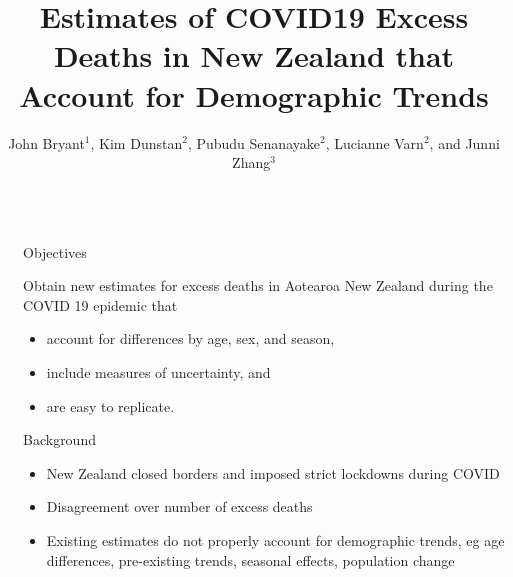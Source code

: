 \documentclass[final]{beamer}
\title{Estimates of COVID19 Excess Deaths in New Zealand that Account for Demographic Trends}
\author{John Bryant$^1$, Kim Dunstan$^2$, Pubudu Senanayake$^2$, Lucianne Varn$^2$, and Junni Zhang$^3$}
\institute{$^{1}$Bayesian Demograpy Limited, $^{2}$Statistics New Zealand, $^{3}$Peking University}
\newlength{\sepwid}
\newlength{\onecolwid}
\begin{document}

\setlength{\belowcaptionskip}{2ex} %
\setlength\belowdisplayshortskip{2ex} %

\begin{frame}[t] %

\begin{columns}[t] %

\begin{column}{\sepwid}\end{column} %

\begin{column}{\onecolwid} %



\begin{alertblock}{Objectives}

Obtain new estimates for excess deaths in Aotearoa New Zealand during the COVID 19 epidemic that
\begin{itemize}
\item account for differences by age, sex, and season,
\item include measures of uncertainty, and
\item are easy to replicate.
\end{itemize}

\end{alertblock}


\begin{block}{Background}

  \begin{itemize}
  \item New Zealand closed borders and imposed strict lockdowns during COVID
  \item Disagreement over number of excess deaths
  \item Existing estimates do not properly account for demographic trends, eg age differences, pre-existing trends, seasonal effects, population change
 \end{itemize}


\end{block}
\end{column}
\end{columns}
\end{frame}
\end{document}
